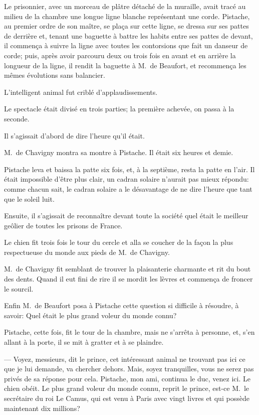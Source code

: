 Le prisonnier, avec un morceau de plâtre détaché de la muraille, avait tracé au milieu de la chambre une longue ligne blanche représentant une corde. Pistache, au premier ordre de son maître, se plaça sur cette ligne, se dressa sur ses pattes de derrière et, tenant une baguette à battre les habits entre ses pattes de devant, il commença à suivre la ligne avec toutes les contorsions que fait un danseur de corde; puis, après avoir parcouru deux ou trois fois en avant et en arrière la longueur de la ligne, il rendit la baguette à M.~de Beaufort, et recommença les mêmes évolutions sans balancier.

L'intelligent animal fut criblé d'applaudissements.

Le spectacle était divisé en trois parties; la première achevée, on passa à la seconde.

Il s'agissait d'abord de dire l'heure qu'il était.

M.~de Chavigny montra sa montre à Pistache. Il était six heures et demie.

Pistache leva et baissa la patte six fois, et, à la septième, resta la patte en l'air. Il était impossible d'être plus clair, un cadran solaire n'aurait pas mieux répondu: comme chacun sait, le cadran solaire a le désavantage de ne dire l'heure que tant que le soleil luit.

Ensuite, il s'agissait de reconnaître devant toute la société quel était le meilleur geôlier de toutes les prisons de France.

Le chien fit trois fois le tour du cercle et alla se coucher de la façon la plus respectueuse du monde aux pieds de M.~de Chavigny.

M.~de Chavigny fit semblant de trouver la plaisanterie charmante et rit du bout des dents. Quand il eut fini de rire il se mordit les lèvres et commença de froncer le sourcil.

Enfin M.~de Beaufort posa à Pistache cette question si difficile à résoudre, à savoir: Quel était le plus grand voleur du monde connu?

Pistache, cette fois, fit le tour de la chambre, mais ne s'arrêta à personne, et, s'en allant à la porte, il se mit à gratter et à se plaindre.

— Voyez, messieurs, dit le prince, cet intéressant animal ne trouvant pas ici ce que je lui demande, va chercher dehors. Mais, soyez tranquilles, vous ne serez pas privés de sa réponse pour cela. Pistache, mon ami, continua le duc, venez ici. Le chien obéit. Le plus grand voleur du monde connu, reprit le prince, est-ce M.~le secrétaire du roi Le Camus, qui est venu à Paris avec vingt livres et qui possède maintenant dix millions?

